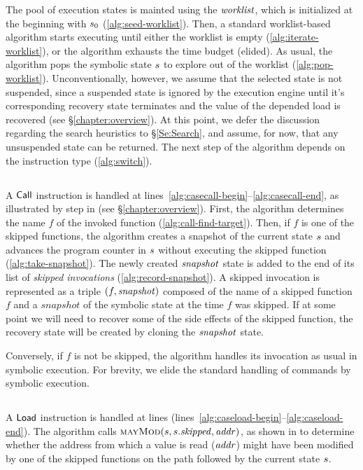 The pool of execution states is mainted using the $\mathit{worklist}$,
which is initialized at the beginning with $s_0$ (\cref{alg:seed-worklist}).
Then, a standard worklist-based algorithm starts executing until either the
worklist is empty (\cref{alg:iterate-worklist}), or the algorithm
exhausts the time budget (elided). As usual, the algorithm pops the
symbolic state $s$ to explore out of the worklist
(\cref{alg:pop-worklist}).
Unconventionally, however, we assume that
the selected state is not suspended, since a suspended state is ignored by the execution engine
until it's corresponding recovery state terminates
and the value of the depended load is recovered (see \S\ref{chapter:overview}).
At this point, we defer the discussion regarding the search heuristics to \S\ref{Se:Search},
and assume, for now, that any unsuspended state can be returned.
The next step of the algorithm depends on the instruction type (\cref{alg:switch}).

\subsection{}
A $\mathsf{Call}$ instruction is handled at lines~\ref{alg:casecall-begin}--\ref{alg:casecall-end},
as illustrated by step  in  (see \S\ref{chapter:overview}).
First, the algorithm determines the name $f$ of the invoked function
(\cref{alg:call-find-target}). Then, if $f$ is one of the skipped
functions, the algorithm creates a snapshot of the current state
$s$ and advances the program counter in $s$
without executing the skipped function (\cref{alg:take-snapshot}).
The newly created $\mathit{snapshot}$ state is added to the end of its list 
of \emph{skipped invocations} (\cref{alg:record-snapshot}).
A skipped invocation is represented
as a triple $(f,\mathit{snapshot})$ composed of the name of a skipped
function $f$ and a $snapshot$ of the symbolic state at the time $f$ was skipped.
If at some point we will need to recover some of the side effects
of the skipped function, the recovery state will be created
by cloning the $\mathit{snapshot}$ state.

Conversely, if $f$ is not be skipped, the algorithm handles its
invocation as usual in symbolic execution.  For brevity, we elide the
standard handling of commands by symbolic execution.

\subsection{}
A $\mathsf{Load}$ instruction is handled
at lines {(lines~\ref{alg:caseload-begin}--\ref{alg:caseload-end})}.
The algorithm calls $\Call{mayMod}{\workstate,\workstate.\skipped,\addr}$,
as shown in 
to determine whether the address from
which a value is read ($\mathit{addr}$) might have been modified by one of the
skipped functions on the path followed by the current state $s$.

